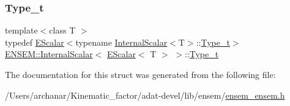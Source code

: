 \subsubsection{\texorpdfstring{Type\_t}{Type\_t}\hspace{0.1cm}{\footnotesize\ttfamily [3/3]}}
{\footnotesize\ttfamily template$<$class T $>$ \\
typedef \mbox{\hyperlink{classENSEM_1_1EScalar}{E\+Scalar}}$<$typename \mbox{\hyperlink{structENSEM_1_1InternalScalar}{Internal\+Scalar}}$<$T$>$\+::\mbox{\hyperlink{structENSEM_1_1InternalScalar_3_01EScalar_3_01T_01_4_01_4_a2f304cf7e12b0c7a448c8094b39fd90d}{Type\+\_\+t}}$>$ \mbox{\hyperlink{structENSEM_1_1InternalScalar}{E\+N\+S\+E\+M\+::\+Internal\+Scalar}}$<$ \mbox{\hyperlink{classENSEM_1_1EScalar}{E\+Scalar}}$<$ T $>$ $>$\+::\mbox{\hyperlink{structENSEM_1_1InternalScalar_3_01EScalar_3_01T_01_4_01_4_a2f304cf7e12b0c7a448c8094b39fd90d}{Type\+\_\+t}}}



The documentation for this struct was generated from the following file\+:\begin{DoxyCompactItemize}
\item 
/\+Users/archanar/\+Kinematic\+\_\+factor/adat-\/devel/lib/ensem/\mbox{\hyperlink{adat-devel_2lib_2ensem_2ensem__ensem_8h}{ensem\+\_\+ensem.\+h}}\end{DoxyCompactItemize}
